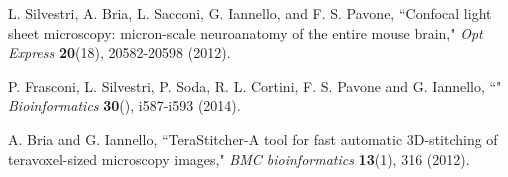 \documentclass[12pt]{spieman}  %
\begin{document}
\begin{thebibliography}{0}
 L. Silvestri, A. Bria, L. Sacconi, G. Iannello,  and F. S. Pavone,  ``Confocal light sheet microscopy: micron-scale neuroanatomy of the entire mouse brain," \emph{Opt Express} \textbf{20}(18), 20582-20598 (2012).

 P. Frasconi, L. Silvestri, P. Soda, R. L. Cortini, F. S. Pavone and G. Iannello, ``" \emph{Bioinformatics} \textbf{30}(), i587-i593 (2014).

 A. Bria and G. Iannello,  ``TeraStitcher-A tool for fast automatic 3D-stitching of teravoxel-sized microscopy images,"  \emph{BMC bioinformatics} \textbf{13}(1), 316 (2012).

\end{thebibliography}


\listoffigures



\listoftables

\end{document}

